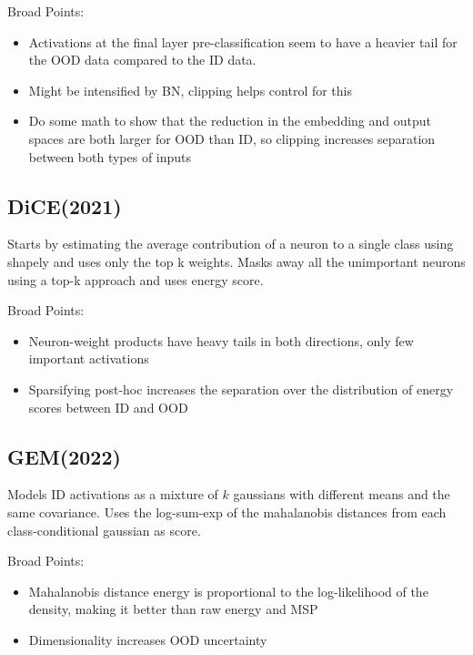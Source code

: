 \documentclass{article}
\begin{document}
            Broad Points:
            \begin{itemize}
                \item 
                    Activations at the final layer pre-classification seem to have a heavier tail for the OOD data compared to the ID data.
                \item 
                    Might be intensified by BN, clipping helps control for this
                \item 
                    Do some math to show that the reduction in the embedding and output spaces are both larger for OOD than ID, so clipping increases separation between both types of inputs

            \end{itemize}
        \subsection{DiCE(2021)}
            Starts by estimating the average contribution of a neuron to a single class using shapely and uses only the top k weights. Masks away all the unimportant neurons using a top-k approach and uses energy score. 
            
            Broad Points:
            \begin{itemize}
                \item 
                    Neuron-weight products have heavy tails in both directions, only few important activations
                \item 
                    Sparsifying post-hoc increases the separation over the distribution of energy scores between ID and OOD
            \end{itemize}
        \subsection{GEM(2022)}
            Models ID activations as a mixture of $k$ gaussians with different means and the same covariance. Uses the log-sum-exp of the mahalanobis distances from each class-conditional gaussian as score.
            
            Broad Points:
            \begin{itemize}
                \item 
                    Mahalanobis distance energy is proportional to the log-likelihood of the density, making it better than raw energy and MSP
                \item 
                    Dimensionality increases OOD uncertainty
            \end{itemize}
\end{document}
